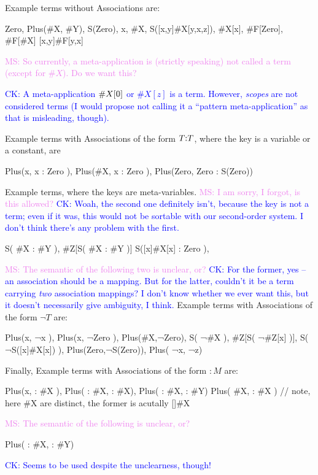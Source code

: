 \documentclass[letterpaper,11pt]{article}
\newcommand{\CK}[1]{\textcolor{blue}{CK: #1}}
\newcommand{\MS}[1]{\textcolor{violet}{MS: #1}}
\begin{document}
\begin{example}
  Example terms without Associations are: 
  \begin{hacs}[numbers=right, texcl]
      Zero, Plus(#X, #Y), S(Zero), x, #X, S([x,y]#X[y,x,z]), #X[x], #F[Zero], #F[#X]
      [x,y]#F[y,x]
    \end{hacs}
    \MS{So currently, a meta-application is (strictly speaking) not called a term (except for
      $\#X$). Do we want this?}

    \CK{A meta-application $\#X[\kw{0}]$ or $\#X[z]$ is a term.  However,
    \emph{scopes} are not considered terms (I would propose not calling it
    a ``pattern meta-application'' as that is misleading, though).}
    
    Example terms with Associations of the form $T \kw{:} T$, where the key is a variable or a
    constant, are
    \begin{hacs}[numbers=right,texcl]
      Plus(x, { x : Zero }), Plus(#X, { x : Zero }), Plus(Zero, {Zero : S(Zero)}) 
    \end{hacs}
    
    Example terms, where the keys are meta-variables. \MS{I am sorry, I forgot, is this allowed?}
    \CK{Woah, the second one definitely isn't, because the key is not a term;
    even if it was, this would not be sortable with our second-order system.
    I don't think there's any problem with the first.}
    \begin{hacs}[numbers=right,texcl]
     S({ #X : #Y }), #Z[S({ #X : #Y })]                    
     S({[x]#X[x] : Zero }), 
   \end{hacs}

   \MS{The semantic of the following two is unclear, or?}
   \CK{For the former, yes -- an association should be a mapping.  But for the
   latter, couldn't it be a term carrying \emph{two} association mappings?  I
   don't know whether we ever want this, but it doesn't necessarily give
   ambiguity, I think.}
   Example terms with Associations of the form $¬T$ are:
   \begin{hacs}[numbers=right,texcl]
     Plus(x, { ¬x }), Plus(x, { ¬Zero }), Plus(#X,{¬Zero}), S({ ¬#X }), 
     #Z[S({ ¬#Z[x] })], S({ ¬S([x]#X[x]) }), Plus(Zero,{¬S(Zero)}), Plus({ ¬x}, { ¬z})
   \end{hacs}
   
   Finally, Example terms with Associations of the form $: M$ are:
   \begin{hacs}[numbers=right,texcl]
     Plus(x, { : #X }), Plus( { : #X}, { : #X}), Plus( { : #X}, { : #Y})
     Plus( #X, { : #X })  // note, here \#X are distinct, the former is acutally []\#X
   \end{hacs}
   
  \MS{The semantic of the following is unclear, or?}
  \begin{hacs}[numbers=right,texcl]
    Plus( { : #X, : #Y})
  \end{hacs}
  \CK{Seems to be used despite the unclearness, though!}
\end{example}  
\end{document}
